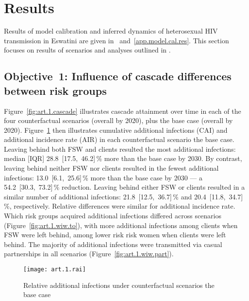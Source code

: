 \section{Results}\label{art.res}
Results of model calibration and inferred dynamics of heterosexual HIV transmission in Eswatini
are given in ~and~\ref{app.model.cal.res}.
This section focuses on results of scenarios and analyses outlined in .
\subsection{Objective~1: Influence of cascade differences between risk groups}\label{art.res.1}
Figure~\ref{fig:art.1.cascade} illustrates cascade attainment over time
in each of the four counterfactual scenarios (\casmd overall by 2020),
plus the base case (\cashi overall by 2020).
Figure~\ref{fig:art.1.rai} then illustrates
cumulative additional infections (CAI) and additional incidence rate (AIR)
in each counterfactual scenario \vs the base case.
Leaving behind both FSW and clients resulted the most additional infections: median [IQR]
28.8~[17.5,~46.2]\,\% more than the base case by 2030. %
By contrast, leaving behind neither FSW nor clients resulted in the fewest additional infections:
13.0~[6.1,~25.6]\,\% more than the base case by 2030 --- %
a 54.2~[30.3,~73.2]\,\% reduction. %
Leaving behind either FSW or clients resulted in a similar number of additional infections:
21.8~[12.5,~36.7]\,\% and 20.4~[11.8,~34.7]\,\%, respectively. %
Relative differences were similar for additional incidence rate.
Which risk groups acquired additional infections differed across scenarios
(Figure~\ref{fig:art.1.wiw.to}),
with more additional infections among clients when FSW were left behind,
\vs among lower risk risk women when clients were left behind.
The majority of additional infections were transmitted
via casual partnerships in all scenarios (Figure~\ref{fig:art.1.wiw.part}). %
\begin{figure}[h]
  \centering\texttt{[image: art.1.rai]}
  \caption{Relative additional infections under counterfactual scenarios \vs the base case}
  \label{fig:art.1.rai}
\end{figure}
